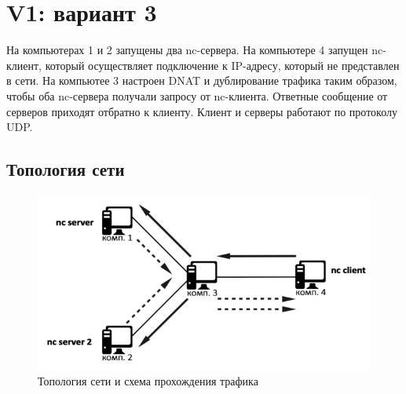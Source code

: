 \documentclass[11pt, a4paper] {ncc}
\begin{document}
\section*{V1: вариант 3}
    На компьютерах 1 и 2 запущены два nc-сервера. На компьютере 4 запущен nc-клиент, который
    осуществляет подключение к IP-адресу, который не представлен в сети. На
    компьютее 3 настроен DNAT и дублирование трафика таким образом, чтобы оба
    nc-сервера получали запросу от nc-клиента. Ответные сообщение от серверов
    приходят отбратно к клиенту. Клиент и серверы работают по протоколу UDP.

    \subsection*{Топология сети}
        \begin{figure}[h!]
            \includegraphics[scale=0.5]{v1_3.png}
            \caption{Топология сети и схема прохождения трафика}
        \end{figure}
\end{document}
